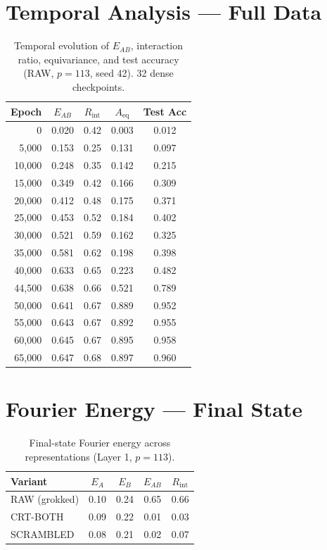 \documentclass[11pt,a4paper]{article}
\newcommand{\EAB}{E_{AB}}
\newcommand{\EA}{E_A}
\newcommand{\EB}{E_B}
\newcommand{\Rint}{R_{\mathrm{int}}}
\newcommand{\Aeq}{A_{\mathrm{eq}}}
\begin{document}
\section{Temporal Analysis --- Full Data}

\begin{table}[h]
\centering
\caption{Temporal evolution of $\EAB$, interaction ratio, equivariance, and test accuracy (RAW, $p=113$, seed 42). 32 dense checkpoints.}
\label{tab:temporal_full}
\begin{tabular}{rcccc}
\toprule
Epoch & $\EAB$ & $\Rint$ & $\Aeq$ & Test Acc \\
\midrule
0 & 0.020 & 0.42 & 0.003 & 0.012 \\
5,000 & 0.153 & 0.25 & 0.131 & 0.097 \\
10,000 & 0.248 & 0.35 & 0.142 & 0.215 \\
15,000 & 0.349 & 0.42 & 0.166 & 0.309 \\
20,000 & 0.412 & 0.48 & 0.175 & 0.371 \\
25,000 & 0.453 & 0.52 & 0.184 & 0.402 \\
30,000 & 0.521 & 0.59 & 0.162 & 0.325 \\
35,000 & 0.581 & 0.62 & 0.198 & 0.398 \\
40,000 & 0.633 & 0.65 & 0.223 & 0.482 \\
44,500 & 0.638 & 0.66 & 0.521 & 0.789 \\
50,000 & 0.641 & 0.67 & 0.889 & 0.952 \\
55,000 & 0.643 & 0.67 & 0.892 & 0.955 \\
60,000 & 0.645 & 0.67 & 0.895 & 0.958 \\
65,000 & 0.647 & 0.68 & 0.897 & 0.960 \\
\bottomrule
\end{tabular}
\end{table}

\section{Fourier Energy --- Final State}

\begin{table}[h]
\centering
\caption{Final-state Fourier energy across representations (Layer 1, $p=113$).}
\begin{tabular}{lcccc}
\toprule
Variant & $\EA$ & $\EB$ & $\EAB$ & $\Rint$ \\
\midrule
RAW (grokked) & 0.10 & 0.24 & 0.65 & 0.66 \\
CRT-BOTH & 0.09 & 0.22 & 0.01 & 0.03 \\
SCRAMBLED & 0.08 & 0.21 & 0.02 & 0.07 \\
\bottomrule
\end{tabular}
\end{table}
\end{document}
